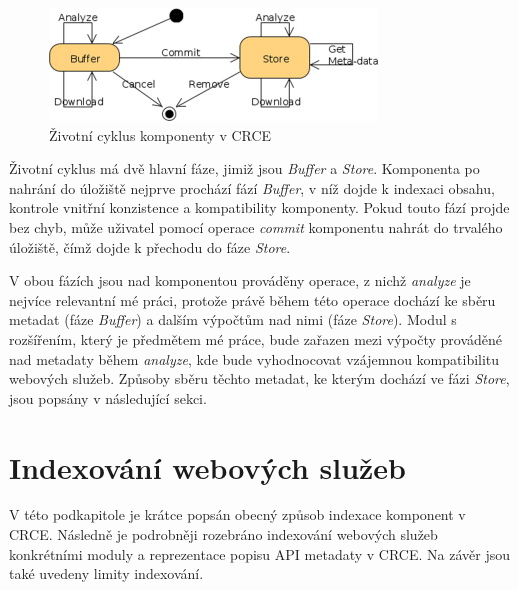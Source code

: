 \documentclass[czech,DP]{thesiskiv}
\begin{document}
\begin{figure}[h]
	\centering
	\includegraphics{crce-component-lc.jpg}
	\caption{Životní cyklus komponenty v CRCE}
	\label{fig:crce-comp-lc}
\end{figure} 

Životní cyklus má dvě hlavní fáze, jimiž jsou \textit{Buffer} a \textit{Store}. Komponenta po nahrání do úložiště nejprve prochází fází \textit{Buffer}, v níž dojde k indexaci obsahu, kontrole vnitřní konzistence a kompatibility komponenty. Pokud touto fází projde bez chyb, může uživatel pomocí operace \textit{commit} komponentu nahrát do trvalého úložiště, čímž dojde k přechodu  do fáze \textit{Store}.

V obou fázích jsou nad komponentou prováděny operace, z nichž \textit{analyze} je nejvíce relevantní mé práci, protože právě během této operace dochází ke sběru metadat (fáze \textit{Buffer}) a dalším výpočtům nad nimi (fáze \textit{Store}). Modul s rozšířením, který je předmětem mé práce, bude zařazen mezi výpočty prováděné nad metadaty během \textit{analyze}, kde bude vyhodnocovat vzájemnou kompatibilitu webových služeb. Způsoby sběru těchto metadat, ke kterým dochází ve fázi \textit{Store}, jsou popsány v následující sekci. 

%
%
%
%
%
%
%

\section{Indexování webových služeb}
\label{sec:api-index}

V této podkapitole je krátce popsán obecný způsob indexace komponent v CRCE. Následně je podrobněji rozebráno indexování webových služeb konkrétními moduly a reprezentace popisu API metadaty v CRCE. Na závěr jsou také uvedeny limity indexování.
\end{document}
